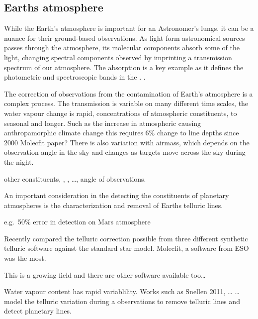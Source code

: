 \subsection{Earths atmosphere}
While the Earth's atmosphere is important for an Astronomer's lungs, it can be a nuance for their ground-based observations. As light form astronomical sources passes through the atmosphere, its molecular components absorb some of the light, changing spectral components observed  by imprinting a transmission spectrum of our atmosphere. The  absorption is a key example as it defines the photometric and spectroscopic bands in the \nir{}. .

The correction of observations from the contamination of Earth's atmosphere is a complex process. The transmission is variable on many different time scales, the water vapour change is rapid, concentrations of atmospheric constituents, to seasonal and longer. Such as the increase in atmospheric  causing anthropamorphic climate change this requires 6\% change to  line depths since 2000 Molecfit paper? There is also variation with airmass, which depends on the observation angle in the sky and changes as targets move across the sky during the night.

other constituents, , ,  \ldots{}, angle of observations.

An important consideration in the detecting the constituents of planetary atmospheres is the characterization and removal of Earths telluric lines.

e.g.\ 50\% error in  detection on Mars atmosphere


Recently \citet{ulmer-moll_telluric_2018} compared the telluric correction possible from three different synthetic telluric software against the standard star model. Molecfit, a software from ESO was the most.

This is a growing field and there are other software available too\ldots{}


Water vapour content has rapid variablility. Works such as Snellen 2011, \ldots{} \ldots{}  model the telluric variation during a observations to remove telluric lines and detect planetary lines.


